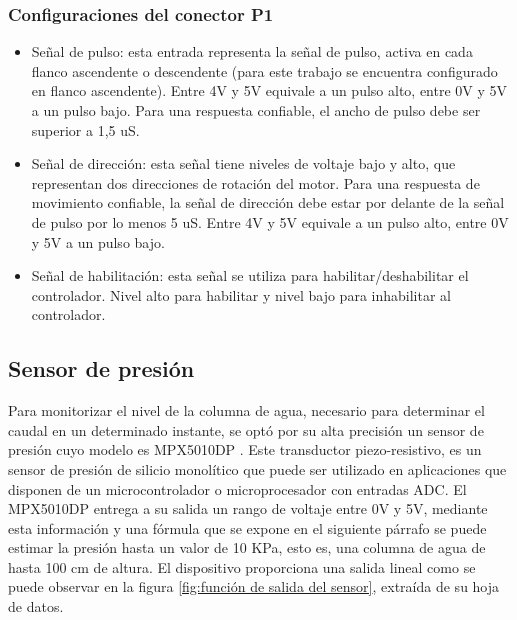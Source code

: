 \subsubsection{Configuraciones del conector P1}
\begin{itemize}

\item Señal de pulso: esta entrada representa la señal de pulso, activa en cada flanco ascendente o descendente (para este trabajo se encuentra configurado en flanco ascendente). Entre 4V y 5V equivale a un pulso alto, entre 0V y 5V a un pulso bajo. Para una respuesta confiable, el ancho de pulso debe ser superior a 1,5 uS. 

\item Señal de dirección: esta señal tiene niveles de voltaje bajo y alto, que representan dos direcciones de rotación del motor. Para una respuesta de movimiento confiable, la señal de dirección debe estar por delante de la señal de pulso por lo menos 5 uS. Entre 4V y 5V equivale a un pulso alto, entre 0V y 5V a un pulso bajo.

\item Señal de habilitación: esta señal se utiliza para habilitar/deshabilitar el controlador. Nivel alto para habilitar y nivel bajo para inhabilitar al controlador.

\end{itemize}
\subsection{Sensor de presión}
Para monitorizar el nivel de la columna de agua, necesario para determinar el caudal en un determinado instante, se optó por su alta precisión un sensor de presión cuyo modelo es MPX5010DP \citep{SENSORPRESION}. Este transductor piezo-resistivo, es un sensor de presión de silicio monolítico que puede ser utilizado en aplicaciones que disponen de un microcontrolador o microprocesador con entradas ADC.
El MPX5010DP entrega a su salida un rango de voltaje entre 0V y 5V, mediante esta información y una fórmula que se expone en el siguiente párrafo se puede estimar la presión hasta un valor de 10 KPa, esto es, una columna de agua de hasta 100 cm de altura.
El dispositivo proporciona una salida lineal como se puede observar en la figura \ref{fig:función de salida del sensor}, extraída de su hoja de datos.

